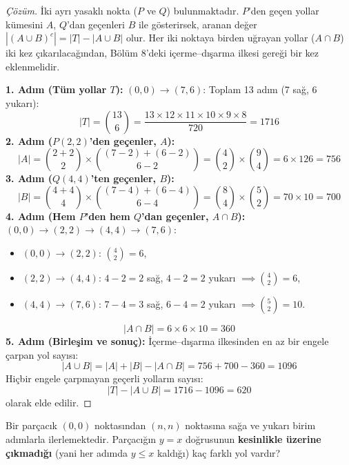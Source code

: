 \begin{proof}[Çözüm]
İki ayrı yasaklı nokta ($P$ ve $Q$) bulunmaktadır. $P$'den geçen yollar kümesini $A$, $Q$'dan geçenleri $B$ ile gösterirsek, aranan değer $|(A \cup B)^c| = |T| - |A \cup B|$ olur. Her iki noktaya birden uğrayan yollar ($A \cap B$) iki kez çıkarılacağından, Bölüm 8'deki içerme--dışarma ilkesi gereği bir kez eklenmelidir.

\textbf{1. Adım (Tüm yollar $T$):}
$(0,0) \to (7,6)$: Toplam 13 adım (7 sağ, 6 yukarı):
\[
|T| = \binom{13}{6} = \frac{13 \times 12 \times 11 \times 10 \times 9 \times 8}{720} = 1716
\]
\textbf{2. Adım ($P(2,2)$'den geçenler, $A$):}
\[
|A| = \binom{2+2}{2} \times \binom{(7-2)+(6-2)}{6-2} = \binom{4}{2} \times \binom{9}{4} = 6 \times 126 = 756
\]
\textbf{3. Adım ($Q(4,4)$'ten geçenler, $B$):}
\[
|B| = \binom{4+4}{4} \times \binom{(7-4)+(6-4)}{6-4} = \binom{8}{4} \times \binom{5}{2} = 70 \times 10 = 700
\]
\textbf{4. Adım (Hem $P$'den hem $Q$'dan geçenler, $A \cap B$):}
$(0,0) \to (2,2) \to (4,4) \to (7,6)$:
\begin{itemize}
    \item $(0,0) \to (2,2)$: $\binom{4}{2} = 6$,
    \item $(2,2) \to (4,4)$: $4-2 = 2$ sağ, $4-2 = 2$ yukarı $\implies \binom{4}{2} = 6$,
    \item $(4,4) \to (7,6)$: $7-4 = 3$ sağ, $6-4 = 2$ yukarı $\implies \binom{5}{2} = 10$.
\end{itemize}
\[
|A \cap B| = 6 \times 6 \times 10 = 360
\]
\textbf{5. Adım (Birleşim ve sonuç):}
İçerme--dışarma ilkesinden en az bir engele çarpan yol sayısı:
\[
|A \cup B| = |A| + |B| - |A \cap B| = 756 + 700 - 360 = 1096
\]
Hiçbir engele çarpmayan geçerli yolların sayısı:
\[
|T| - |A \cup B| = 1716 - 1096 = 620
\]
olarak elde edilir.
\end{proof}

\begin{example}
Bir parçacık $(0,0)$ noktasından $(n,n)$ noktasına sağa ve yukarı birim adımlarla ilerlemektedir. Parçacığın $y = x$ doğrusunun \textbf{kesinlikle üzerine çıkmadığı} (yani her adımda $y \le x$ kaldığı) kaç farklı yol vardır?
\end{example}

